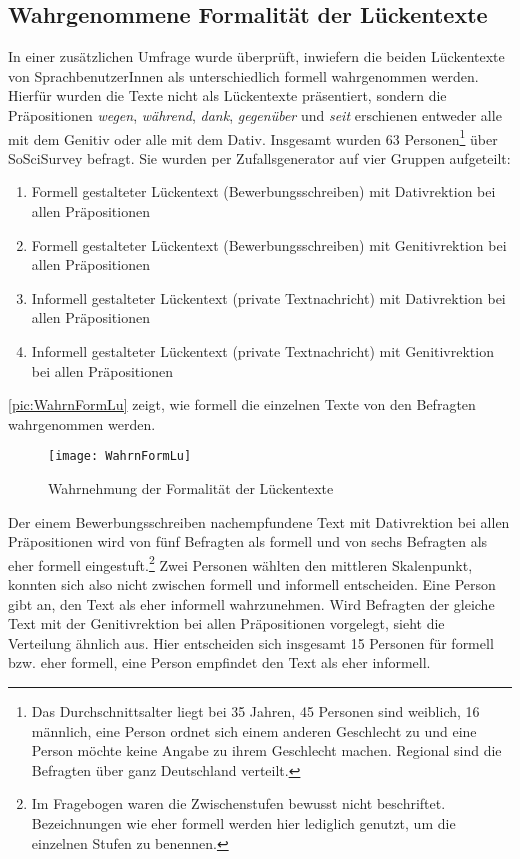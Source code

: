 \subsection{Wahrgenommene Formalität der Lückentexte}
\label{sec:FormLU}
In einer zusätzlichen Umfrage wurde überprüft, inwiefern die beiden Lückentexte von SprachbenutzerInnen als unterschiedlich formell wahrgenommen werden. 
Hierfür wurden die Texte nicht als Lückentexte präsentiert, sondern die Präpositionen \textit{wegen}, \textit{während}, \textit{dank}, \textit{gegenüber} und \textit{seit} erschienen entweder alle mit dem Genitiv oder alle mit dem Dativ. 
Insgesamt wurden 63 Personen\footnote{Das Durchschnittsalter liegt bei 35 Jahren, 45 Personen sind weiblich, 16 männlich, eine Person ordnet sich einem anderen Geschlecht zu und eine Person möchte keine Angabe zu ihrem Geschlecht machen. Regional sind die Befragten über ganz Deutschland verteilt.} über SoSciSurvey \citep{Leiner.2014} befragt.
Sie wurden per Zufallsgenerator auf vier Gruppen aufgeteilt: 
\begin{enumerate}
\item Formell gestalteter Lückentext (Bewerbungsschreiben) mit Dativrektion bei allen Präpositionen
\item Formell gestalteter Lückentext (Bewerbungsschreiben) mit Genitivrektion bei allen Präpositionen 
\item Informell gestalteter Lückentext (private Textnachricht) mit Dativrektion bei allen Präpositionen
\item Informell gestalteter Lückentext (private Textnachricht) mit Genitivrektion bei allen Präpositionen
\end{enumerate}
\autoref{pic:WahrnFormLu} zeigt, wie formell die einzelnen Texte von den Befragten wahrgenommen werden. 
\begin{figure}
\centering
\texttt{[image: WahrnFormLu]}
\caption{Wahrnehmung der Formalität der Lückentexte}
\label{pic:WahrnFormLu}
\end{figure}

Der einem Bewerbungsschreiben nachempfundene Text mit Dativrektion bei allen Präpositionen wird von fünf Befragten als formell und von sechs Befragten als eher formell eingestuft.\footnote{Im Fragebogen waren die Zwischenstufen bewusst nicht beschriftet. Bezeichnungen wie \glqq eher formell\grqq{} werden hier lediglich genutzt, um die einzelnen Stufen zu benennen.} 
Zwei Personen wählten den mittleren Skalenpunkt, konnten sich also nicht zwischen formell und informell entscheiden. Eine Person gibt an, den Text als eher informell wahrzunehmen. 
Wird Befragten der gleiche Text mit der Genitivrektion bei allen Präpositionen vorgelegt, sieht die Verteilung ähnlich aus. 
Hier entscheiden sich insgesamt 15 Personen für formell bzw. eher formell, eine Person empfindet den Text als eher informell. 

